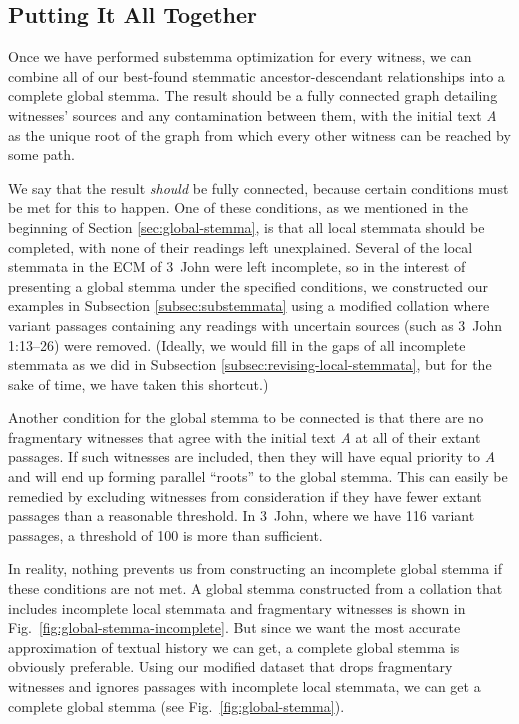 \documentclass[a4paper, 12pt]{article}
\begin{document}
	\newpage
	
	\subsection{Putting It All Together}
	Once we have performed substemma optimization for every witness, we can combine all of our best-found stemmatic ancestor-descendant relationships into a complete global stemma. The result should be a fully connected graph detailing witnesses' sources and any contamination between them, with the initial text \emph{A} as the unique root of the graph from which every other witness can be reached by some path.
	
	We say that the result \emph{should} be fully connected, because certain conditions must be met for this to happen. One of these conditions, as we mentioned in the beginning of Section \ref{sec:global-stemma}, is that all local stemmata should be completed, with none of their readings left unexplained. Several of the local stemmata in the ECM of 3~John were left incomplete, so in the interest of presenting a global stemma under the specified conditions, we constructed our examples in Subsection \ref{subsec:substemmata} using a modified collation where variant passages containing any readings with uncertain sources (such as 3~John 1:13–26) were removed. (Ideally, we would fill in the gaps of all incomplete stemmata as we did in Subsection \ref{subsec:revising-local-stemmata}, but for the sake of time, we have taken this shortcut.)
	
	Another condition for the global stemma to be connected is that there are no fragmentary witnesses that agree with the initial text \emph{A} at all of their extant passages. If such witnesses are included, then they will have equal priority to \emph{A} and will end up forming parallel ``roots'' to the global stemma. This can easily be remedied by excluding witnesses from consideration if they have fewer extant passages than a reasonable threshold. In 3~John, where we have 116 variant passages, a threshold of 100 is more than sufficient.
	
	In reality, nothing prevents us from constructing an incomplete global stemma if these conditions are not met. A global stemma constructed from a collation that includes incomplete local stemmata and fragmentary witnesses is shown in Fig.~\ref{fig:global-stemma-incomplete}. But since we want the most accurate approximation of textual history we can get, a complete global stemma is obviously preferable. Using our modified dataset that drops fragmentary witnesses and ignores passages with incomplete local stemmata, we can get a complete global stemma (see Fig.~\ref{fig:global-stemma}).
	
\end{document}
